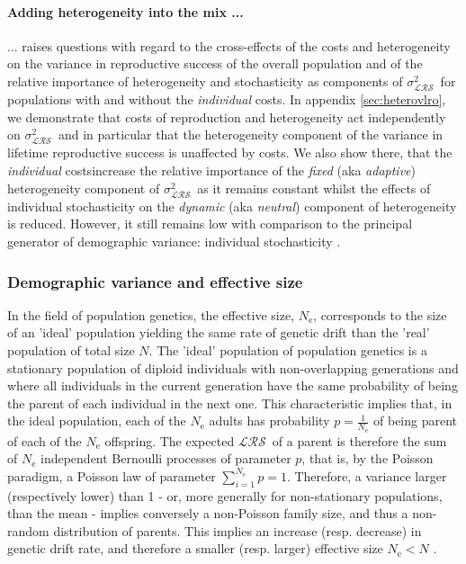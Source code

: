 \documentclass[10pt,a4paper]{article}
\newcommand{\LRO}{$\mathcal{LRS}$}
\newcommand{\PCoR}{\emph{individual} costs}
\newcommand{\vLRO}{$\sigma_{\mathrm{\mathcal{LRS}}}^2$}
\begin{document}
\paragraph{Adding heterogeneity into the mix ...} 
 ... raises questions with regard to the cross-effects of the costs and heterogeneity on the variance in reproductive success of the overall population and of the relative importance of heterogeneity and stochasticity as components of \vLRO\ for populations with and without the \PCoR. In appendix \ref{sec:heterovlro}, we demonstrate that costs of reproduction and heterogeneity act independently on \vLRO\ and in particular that the heterogeneity component of the variance in lifetime reproductive success %
is unaffected by costs. We also show there, that the \PCoR increase the relative importance of the \emph{fixed} (aka \emph{adaptive}) heterogeneity component of \vLRO\ as it remains constant whilst the effects of individual stochasticity on the \emph{dynamic} (aka \emph{neutral}) component of heterogeneity is reduced. However, it still remains low with comparison to the principal generator of demographic variance: individual stochasticity \citep[in agreement with many authors, see for instance][]{Snyder2018,Steiner2012}.



\subsubsection{Demographic variance and effective size}
\label{sec:demvareffsize} 
 In the field of population genetics, the effective size, $N_{\mathrm{e}}$, corresponds to the size of an 'ideal' population yielding the same rate of genetic drift \citep{Wright1931} than the 'real' population of total size $N$. The 'ideal' population of population genetics is a stationary population of diploid individuals with non-overlapping generations and where all individuals in the current generation have the same probability of being the parent of each individual in the next one.
This characteristic implies that, in the ideal population, each of the $N_{\mathrm{e}}$ adults has probability $p=\frac{1}{N_{\mathrm{e}}}$ of being parent of each of the $N_{\mathrm{e}}$ offspring. The expected \LRO\ of a parent is therefore the sum of $N_{\mathrm{e}}$ independent Bernoulli processes of parameter $p$, that is, by the Poisson paradigm, a Poisson law of parameter $\sum_{i=1}^{N_{\mathrm{e}}} p =1$. Therefore, a variance larger (respectively lower) than 1 - or, more generally for non-stationary populations, than the mean - implies conversely a non-Poisson family size, and thus a non-random distribution of parents. This implies an increase (resp. decrease) in genetic drift rate, and therefore a smaller (resp. larger) effective size $N_{\mathrm{e}}<N$ .\\
\end{document}
